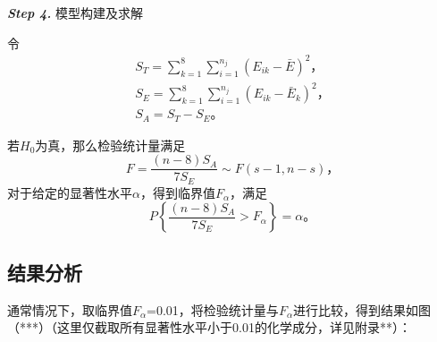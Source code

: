 \documentclass[withoutpreface,bwprint]{cumcmthesis}
\begin{document}
\textbf{\emph{Step 4. }}模型构建及求解

令
\begin{gather}
	S_T=\sum_{k=1}^8\sum_{i=1}^{n_j}(E_{ik}-\bar{E})^2\text{，}\\
	S_E=\sum_{k=1}^8\sum_{i=1}^{n_j}(E_{ik}-\bar{E}_k)^2\text{，}\\
	S_A=S_T-S_E\text{。}
\end{gather}

若$H_0$为真，那么检验统计量满足
\begin{equation}
	F=\frac{(n-8)S_A}{7S_E}\sim F(s-1,n-s)\text{，}
\end{equation}
对于给定的显著性水平$\alpha$，得到临界值$F_\alpha$，满足
\begin{equation}
	P\left\{\frac{(n-8)S_A}{7S_E}>F_\alpha\right\}=\alpha\text{。}
\end{equation}

 \subsection{结果分析}
通常情况下，取临界值$F_\alpha$=0.01，将检验统计量与$F_\alpha$进行比较，得到结果如图（***）（这里仅截取所有显著性水平小于0.01的化学成分，详见附录**）：
\end{document}
